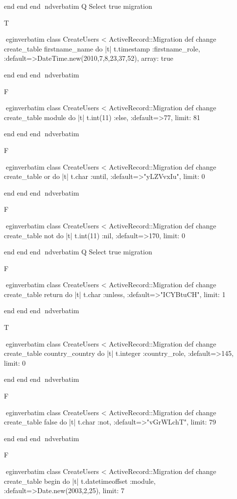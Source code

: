     end 
  end 
end
nd{verbatim}
Q
 Select true migration

T

egin{verbatim}
 class CreateUsers < ActiveRecord::Migration 
  def change 
    create_table firstname_name do |t| 
      t.timestamp :firstname_role, :default=>DateTime.new(2010,7,8,23,37,52), array: true
    
    end 
  end 
end
nd{verbatim}

F

egin{verbatim}
 class CreateUsers < ActiveRecord::Migration 
  def change 
    create_table module do |t| 
      t.int(11) :else, :default=>77, limit: 81
    
    end 
  end 
end
nd{verbatim}

F

egin{verbatim}
 class CreateUsers < ActiveRecord::Migration 
  def change 
    create_table or do |t| 
      t.char :until, :default=>"yLZVvxIu", limit: 0
    
    end 
  end 
end
nd{verbatim}

F

egin{verbatim}
 class CreateUsers < ActiveRecord::Migration 
  def change 
    create_table not do |t| 
      t.int(11) :nil, :default=>170, limit: 0
    
    end 
  end 
end
nd{verbatim}
Q
 Select true migration

F

egin{verbatim}
 class CreateUsers < ActiveRecord::Migration 
  def change 
    create_table return do |t| 
      t.char :unless, :default=>"ICYBtuCH", limit: 1
    
    end 
  end 
end
nd{verbatim}

T

egin{verbatim}
 class CreateUsers < ActiveRecord::Migration 
  def change 
    create_table country_country do |t| 
      t.integer :country_role, :default=>145, limit: 0
    
    end 
  end 
end
nd{verbatim}

F

egin{verbatim}
 class CreateUsers < ActiveRecord::Migration 
  def change 
    create_table false do |t| 
      t.char :not, :default=>"vGrWLchT", limit: 79
    
    end 
  end 
end
nd{verbatim}

F

egin{verbatim}
 class CreateUsers < ActiveRecord::Migration 
  def change 
    create_table begin do |t| 
      t.datetimeoffset :module, :default=>Date.new(2003,2,25), limit: 7
    
